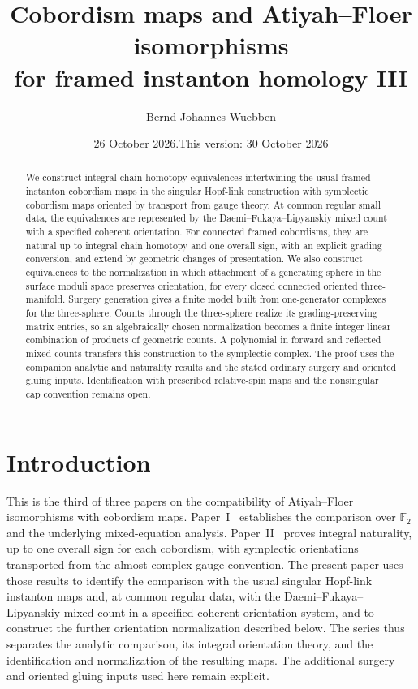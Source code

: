 \documentclass[11pt]{amsart}
\title[Atiyah--Floer cobordism maps III]{Cobordism maps and Atiyah--Floer isomorphisms\\
for framed instanton homology III}
\author{Bernd Johannes Wuebben}
\date{26 October 2026.\newline This version: 30 October 2026}
\theoremstyle{definition}
\theoremstyle{remark}
\theoremstyle{plain}
\begin{document}
\begin{abstract}
We construct integral chain homotopy equivalences intertwining the
usual framed instanton cobordism maps in the singular Hopf-link
construction with symplectic cobordism maps oriented by transport
from gauge theory. At common regular small data, the equivalences
are represented by the
Daemi--Fukaya--Lipyanskiy mixed count with a specified coherent
orientation. For connected framed cobordisms, they are natural up
to integral chain homotopy and one overall sign, with an explicit
grading conversion, and extend by geometric changes of
presentation. We also construct equivalences to the normalization
in which attachment of a generating sphere in the surface moduli
space preserves orientation, for every closed connected oriented
three-manifold. Surgery generation gives a finite model built from
one-generator complexes for the three-sphere. Counts through the three-sphere realize
its grading-preserving matrix entries, so an algebraically chosen
normalization becomes a finite integer linear combination of
products of geometric counts. A polynomial in forward and reflected
mixed counts transfers this construction to the symplectic complex.
The proof uses the companion analytic and naturality results and
the stated ordinary surgery and oriented gluing inputs.
Identification with prescribed relative-spin maps and the
nonsingular cap convention remains open.
\end{abstract}
\maketitle

\section{Introduction}

This is the third of three papers on the compatibility of Atiyah--Floer
isomorphisms with cobordism maps. Paper~I~\cite{PaperI} establishes the
comparison over $\mathbb F_2$ and the underlying mixed-equation
analysis. Paper~II~\cite{PaperII} proves integral naturality, up to
one overall sign for each cobordism, with symplectic orientations
transported from the almost-complex gauge convention. The present
paper uses those results to identify the comparison with the usual
singular Hopf-link instanton maps and, at common regular data, with the
Daemi--Fukaya--Lipyanskiy mixed count in a specified coherent
orientation system, and to construct the further
orientation normalization described below. The series thus separates
the analytic comparison, its integral orientation theory, and the
identification and normalization of the resulting maps. The additional
surgery and oriented gluing inputs used here remain explicit.
\end{document}
